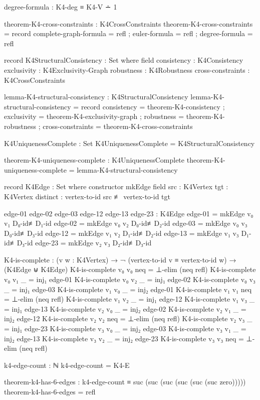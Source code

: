 \documentclass[11pt,a4paper]{book}
\begin{document}
\begin{code}
    degree-formula         : K4-deg ≡ K4-V ∸ 1

theorem-K4-cross-constraints : K4CrossConstraints
theorem-K4-cross-constraints = record
  { complete-graph-formula = refl
  ; euler-formula          = refl
  ; degree-formula         = refl
  }

record K4StructuralConsistency : Set where
  field
    consistency       : K4Consistency
    exclusivity       : K4Exclusivity-Graph
    robustness        : K4Robustness
    cross-constraints : K4CrossConstraints

lemma-K4-structural-consistency : K4StructuralConsistency
lemma-K4-structural-consistency = record
  { consistency       = theorem-K4-consistency
  ; exclusivity       = theorem-K4-exclusivity-graph
  ; robustness        = theorem-K4-robustness
  ; cross-constraints = theorem-K4-cross-constraints
  }

K4UniquenessComplete : Set
K4UniquenessComplete = K4StructuralConsistency

theorem-K4-uniqueness-complete : K4UniquenessComplete
theorem-K4-uniqueness-complete = lemma-K4-structural-consistency

record K4Edge : Set where
  constructor mkEdge
  field
    src      : K4Vertex
    tgt      : K4Vertex
    distinct : vertex-to-id src ≢ vertex-to-id tgt

edge-01 edge-02 edge-03 edge-12 edge-13 edge-23 : K4Edge
edge-01 = mkEdge v₀ v₁ D₀-id≢D₁-id
edge-02 = mkEdge v₀ v₂ D₀-id≢D₂-id
edge-03 = mkEdge v₀ v₃ D₀-id≢D₃-id
edge-12 = mkEdge v₁ v₂ D₁-id≢D₂-id
edge-13 = mkEdge v₁ v₃ D₁-id≢D₃-id
edge-23 = mkEdge v₂ v₃ D₂-id≢D₃-id

K4-is-complete : (v w : K4Vertex) → ¬ (vertex-to-id v ≡ vertex-to-id w) → 
                 (K4Edge ⊎ K4Edge)
K4-is-complete v₀ v₀ neq = ⊥-elim (neq refl)
K4-is-complete v₀ v₁ _   = inj₁ edge-01
K4-is-complete v₀ v₂ _   = inj₁ edge-02
K4-is-complete v₀ v₃ _   = inj₁ edge-03
K4-is-complete v₁ v₀ _   = inj₂ edge-01
K4-is-complete v₁ v₁ neq = ⊥-elim (neq refl)
K4-is-complete v₁ v₂ _   = inj₁ edge-12
K4-is-complete v₁ v₃ _   = inj₁ edge-13
K4-is-complete v₂ v₀ _   = inj₂ edge-02
K4-is-complete v₂ v₁ _   = inj₂ edge-12
K4-is-complete v₂ v₂ neq = ⊥-elim (neq refl)
K4-is-complete v₂ v₃ _   = inj₁ edge-23
K4-is-complete v₃ v₀ _   = inj₂ edge-03
K4-is-complete v₃ v₁ _   = inj₂ edge-13
K4-is-complete v₃ v₂ _   = inj₂ edge-23
K4-is-complete v₃ v₃ neq = ⊥-elim (neq refl)

k4-edge-count : ℕ
k4-edge-count = K4-E

theorem-k4-has-6-edges : k4-edge-count ≡ suc (suc (suc (suc (suc (suc zero)))))
theorem-k4-has-6-edges = refl


\end{code}
\end{document}
